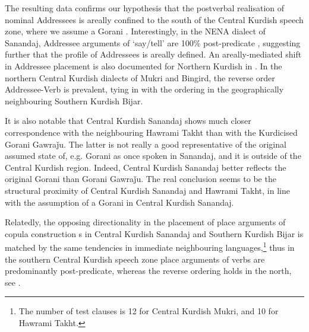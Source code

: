 \documentclass[output=paper,colorlinks,citecolor=brown]{langscibook}
\begin{document}
\begin{sloppypar}
The resulting data confirms our hypothesis that the postverbal realisation of nominal Addressees is areally confined to the south of the Central Kurdish speech zone, where we assume a Gorani . Interestingly, in the NENA dialect of Sanandaj, Addressee arguments of `say/tell' are 100\% post-predicate \citep[see][]{Noorlander2022WOWAJSana}{}{}, suggesting further that the  profile of Addressees is areally defined. An areally-mediated shift in Addressee placement is also documented for Northern Kurdish in \citet{Haig2022PostPredicateCon}. In the northern Central Kurdish dialects  of Mukri and Bingird, the reverse order Addressee-Verb is prevalent, tying in with the ordering in the geographically neighbouring Southern Kurdish Bijar. 

It is also notable that Central Kurdish Sanandaj shows much closer correspondence with the neighbouring Hawrami Takht than with the Kurdicised Gorani Gawraǰu. The latter is not really a good representative of the original assumed state of, e.g. Gorani as once spoken in Sanandaj, and it is outside of the Central Kurdish region. Indeed, Central Kurdish Sanandaj better reflects the original Gorani  than Gorani Gawraǰu. The real conclusion seems to be the structural proximity of Central Kurdish Sanandaj and Hawrami Takht, in line with the assumption of a Gorani  in Central Kurdish Sanandaj.

Relatedly, the opposing directionality in the placement of place arguments of copula construction
s in Central Kurdish Sanandaj and Southern Kurdish Bijar is matched by the same tendencies in immediate neighbouring languages,\footnote{The number of test clauses is 12 for Central Kurdish Mukri, and 10 for Hawrami Takht.} thus in the southern Central Kurdish speech zone place arguments of  verbs are predominantly post-predicate, whereas the reverse ordering holds in the north, see .


\end{sloppypar}
\end{document}
